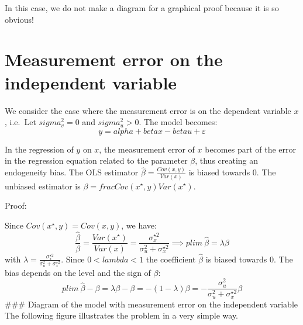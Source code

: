 \documentclass[
]{report}
\begin{document}
In this case, we do not make a diagram for a graphical proof because it is so obvious!

\hypertarget{measurement-error-on-the-independent-variable}{%
\section{Measurement error on the independent variable}\label{measurement-error-on-the-independent-variable}}

We consider the case where the measurement error is on the dependent variable \(x\), i.e.~Let \(sigma_v^2 =0\) and \(sigma_u^2 >0\).
The model becomes:
\[y=alpha+beta x -beta u + \varepsilon\]

In the regression of \(y\) on \(x\), the measurement error of \(x\) becomes part of the error in the regression equation related to the parameter \(\beta\), thus creating an endogeneity bias. The OLS estimator \(\hat{\beta}=\frac{Cov(x,y)}{Var(x)}\) is biased towards 0. The unbiased estimator is \(\beta=frac{Cov(x^\star ,y)}{Var(x^\star)}\).

Proof:

Since \(Cov(x^\star,y)=Cov(x,y)\), we have:
\[\frac{\hat{\beta}}{\beta}=\frac{Var(x^\star)}{Var(x)}=\frac{\sigma_x^{\star 2}}{\sigma_u^2+\sigma_x^{\star 2}} \implies plim~\hat{\beta}=\lambda \beta\]
with \(\lambda=\frac{\sigma_x^{\star 2}}{\sigma_u^2+\sigma_x^{\star 2}}\). Since \(0<lambda<1\) the coefficient \(\hat{\beta}\) is biased towards 0.
The bias depends on the level and the sign of \(\beta\):
\[plim~\hat{\beta}-\beta=\lambda \beta-\beta=-(1-\lambda)\beta=-\frac{\sigma_u^2}{\sigma_u^2+\sigma_x^{\star 2}}\beta\]
\#\#\# Diagram of the model with measurement error on the independent variable
The following figure illustrates the problem in a very simple way.
\end{document}
